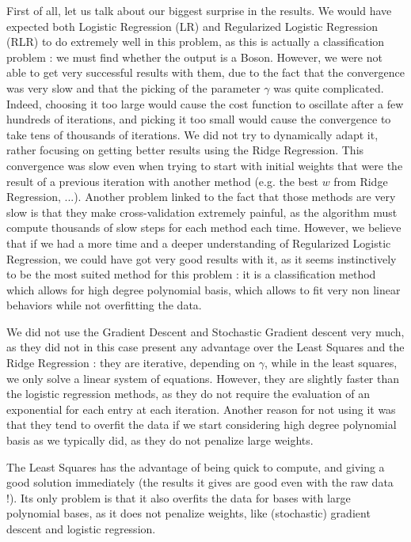 \documentclass[10pt,conference,compsocconf]{IEEEtran}
\begin{document}
First of all, let us talk about our biggest surprise in the results. We would have expected both Logistic Regression (LR) and Regularized Logistic Regression (RLR) to do extremely well in this problem, as this is actually a classification problem : we must find whether the output is a Boson. However, we were not able to get very successful results with them, due to the fact that the convergence was very slow and that the picking of the parameter $\gamma$ was quite complicated.  Indeed, choosing it too large would cause the cost function to oscillate after a few hundreds of iterations, and picking it too small would cause the convergence to take tens of thousands of iterations. We did not try to dynamically adapt it, rather focusing on getting better results using the Ridge Regression. This convergence was slow even when trying to start with initial weights that were the result of a previous iteration with another method (e.g. the best $w$ from Ridge Regression, ...). Another problem linked to the fact that those methods are very slow is that they make cross-validation extremely painful, as the algorithm must compute thousands of slow steps for each method each time. However, we believe that if we had a more time and a deeper understanding of Regularized Logistic Regression, we could have got very good results with it, as it seems instinctively to be the most suited method for this problem : it is a classification method which allows for high degree polynomial basis, which allows to fit very non linear behaviors while not overfitting the data. 

We did not use the Gradient Descent and Stochastic Gradient descent very much, as they did not in this case present any advantage over the Least Squares and the Ridge Regression : they are iterative, depending on $\gamma$, while in the least squares, we only solve a linear system of equations. However, they are slightly faster than the logistic regression methods, as they do not require the evaluation of an exponential for each entry at each iteration. Another reason for not using it was that they tend to overfit the data if we start considering high degree polynomial basis as we typically did, as they do not penalize large weights.

The Least Squares has the advantage of being quick to compute, and giving a good solution immediately (the results it gives are good even with the raw data !). Its only problem is that it also overfits the data for bases with large polynomial bases, as it does not penalize weights, like (stochastic) gradient descent and logistic regression.
\end{document}
